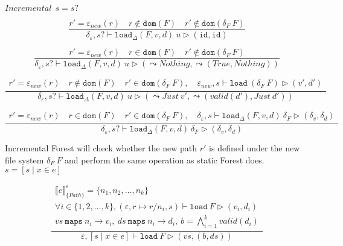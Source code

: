 \documentclass[10pt,twoside,a4paper]{article}
\theoremstyle{theorem}
\theoremstyle{lemma}
\theoremstyle{property}
\theoremstyle{definition}
\theoremstyle{assumption}
\begin{document}
$\boxed{Incremental~~s = s?}$

\begin{displaymath}
	\frac{
		r' = \varepsilon_{new}(r) \quad r \notin \mathtt{dom}(F) \quad r' \notin \mathtt{dom}(\delta_F~F)
	}
	{\delta_\varepsilon, s? \vdash \mathtt{load}_\Delta (F,v,d)~ u \rhd (\mathtt{id}, \mathtt{id})}
\end{displaymath}

\begin{displaymath}
	\frac{
		r' = \varepsilon_{new}(r)  \quad r \in \mathtt{dom}(F) \quad r' \notin \mathtt{dom}(\delta_F~F)
	}
	{\delta_\varepsilon, s? \vdash \mathtt{load}_\Delta (F,v,d)~ u \rhd (\leadsto Nothing,\leadsto (True,Nothing))}
\end{displaymath}

\begin{displaymath}
	\frac{\begin{array}{c}
	r' = \varepsilon_{new}(r) \quad r \notin \mathtt{dom}(F) \quad r' \in \mathtt{dom}(\delta_F~F), \quad
		\varepsilon_{new}, s \vdash \mathtt{load}~ (\delta_F~F) \rhd (v',d')
	\end{array}}
	{\delta_\varepsilon, s? \vdash \mathtt{load}_\Delta (F,v,d)~ u \rhd (\leadsto Just~v',\leadsto (valid(d'),Just~d'))}
\end{displaymath}

\begin{displaymath}
	\frac{\begin{array}{c}
	r' = \varepsilon_{new}(r) \quad r \in \mathtt{dom}(F) \quad r' \in \mathtt{dom}(\delta_F~F), \quad
		\delta_\varepsilon, s \vdash \mathtt{load}_\Delta (F,v,d)~ \delta_F \rhd (\delta_v,\delta_d)
	\end{array}}
	{\delta_\varepsilon, s? \vdash \mathtt{load}_\Delta (F,v,d)~ \delta_F \rhd (\delta_v,\delta_d)}
\end{displaymath}

Incremental Forest will check whether the new path $r'$ is defined under the new file system $\delta_F~F$ and perform the same operation as static Forest does.\\

$\boxed{s = [ s \mid x \in e]}$

\begin{displaymath}
	\frac{\begin{array}{c}
		\llbracket e \rrbracket^{\varepsilon}_{\{Path\}} = \{n_1,n_2,\dots,n_k\}\\
		\forall i \in \{1,2,\dots,k\}, (\varepsilon, r \mapsto r/n_i,s) \vdash \mathtt{load}~F \rhd (v_i, d_i)\\
		vs ~\mathtt{maps} ~n_i \to v_i, ~ds ~\mathtt{maps} ~n_i \to d_i, ~b = \bigwedge_{i=1}^k valid(d_i) 
	\end{array}}
	{\varepsilon, [ s \mid x \in e] \vdash \mathtt{load}~F \rhd (vs,(b,ds)) }
\end{displaymath}
\end{document}
